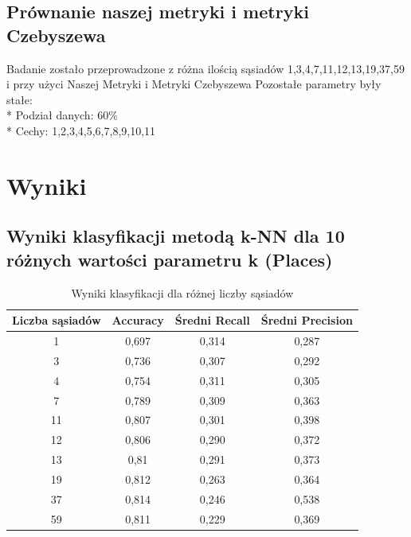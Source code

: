 \documentclass{classrep}
\begin{document}
{\subsection{Prównanie naszej metryki i metryki Czebyszewa}
Badanie zostało przeprowadzone z różna ilością sąsiadów {1,3,4,7,11,12,13,19,37,59} i przy użyci Naszej Metryki i Metryki Czebyszewa
Pozostałe parametry były stałe:
\\*
Podział danych: 60\%
\\*
Cechy: 1,2,3,4,5,6,7,8,9,10,11
}

\section{Wyniki}
{
\subsection{Wyniki klasyfikacji metodą k-NN dla 10 różnych wartości parametru k (Places)}

\begin{table}[H]
\begin{center}
\caption{Wyniki klasyfikacji dla różnej liczby sąsiadów}
\begin{tabular}{|c|c|c|c|}
\hline
\textbf{Liczba sąsiadów} & \textbf{Accuracy} & \textbf{Średni Recall} & \textbf{Średni Precision} \\ \hline
1                        & 0,697             & 0,314                  & 0,287             \\ \hline
3                        & 0,736             & 0,307                  & 0,292             \\ \hline
4                        & 0,754             & 0,311                  & 0,305             \\ \hline
7                        & 0,789             & 0,309                  & 0,363             \\ \hline
11                       & 0,807             & 0,301                  & 0,398             \\ \hline
12                       & 0,806             & 0,290                  & 0,372             \\ \hline
13                       & 0,81              & 0,291                  & 0,373             \\ \hline
19                       & 0,812             & 0,263                  & 0,364             \\ \hline
37                       & 0,814             & 0,246                  & 0,538             \\ \hline
59                       & 0,811             & 0,229                  & 0,369             \\ \hline
\end{tabular}
\end{center}
\end{table}

}
\end{document}
